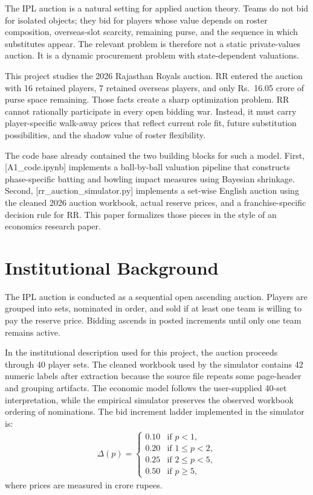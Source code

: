 \documentclass[11pt]{article}
\begin{document}
The IPL auction is a natural setting for applied auction theory. Teams do not bid for isolated objects; they bid for players whose value depends on roster composition, overseas-slot scarcity, remaining purse, and the sequence in which substitutes appear. The relevant problem is therefore not a static private-values auction. It is a dynamic procurement problem with state-dependent valuations.

This project studies the 2026 Rajasthan Royals auction. RR entered the auction with 16 retained players, 7 retained overseas players, and only Rs.\ 16.05 crore of purse space remaining. Those facts create a sharp optimization problem. RR cannot rationally participate in every open bidding war. Instead, it must carry player-specific walk-away prices that reflect current role fit, future substitution possibilities, and the shadow value of roster flexibility.

The code base already contained the two building blocks for such a model. First, [A1\_code.ipynb] implements a ball-by-ball valuation pipeline that constructs phase-specific batting and bowling impact measures using Bayesian shrinkage. Second, [rr\_auction\_simulator.py] implements a set-wise English auction using the cleaned 2026 auction workbook, actual reserve prices, and a franchise-specific decision rule for RR. This paper formalizes those pieces in the style of an economics research paper.

\section{Institutional Background}

The IPL auction is conducted as a sequential open ascending auction. Players are grouped into sets, nominated in order, and sold if at least one team is willing to pay the reserve price. Bidding ascends in posted increments until only one team remains active.

In the institutional description used for this project, the auction proceeds through 40 player sets. The cleaned workbook used by the simulator contains 42 numeric labels after extraction because the source file repeats some page-header and grouping artifacts. The economic model follows the user-supplied 40-set interpretation, while the empirical simulator preserves the observed workbook ordering of nominations. The bid increment ladder implemented in the simulator is:
\begin{align}
\Delta(p)=
\begin{cases}
0.10 & \text{if } p<1,\\
0.20 & \text{if } 1\leq p<2,\\
0.25 & \text{if } 2\leq p<5,\\
0.50 & \text{if } p\geq 5,
\end{cases}
\end{align}
where prices are measured in crore rupees.
\end{document}
